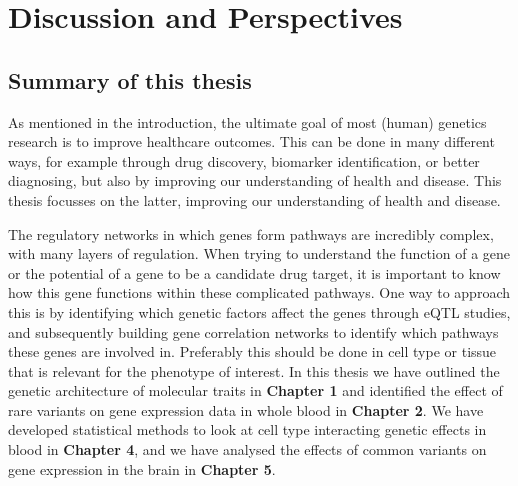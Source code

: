 \chapter{Discussion and Perspectives}
\label{chap:discussion}

{ \Large {} }

\newpage

\section{Summary of this thesis}
As mentioned in the introduction, the ultimate goal of most (human) genetics research is to improve healthcare outcomes. This can be done in many different ways, for example through drug discovery, biomarker identification, or better diagnosing, but also by improving our understanding of health and disease\cite{mcguireRoadAheadGenetics2020, claussnitzerBriefHistoryHuman2020e}. This thesis focusses on the latter, improving our understanding of health and disease. 

The regulatory networks in which genes form pathways are incredibly complex, with many layers of regulation. When trying to understand the function of a gene or the potential of a gene to be a candidate drug target, it is important to know how this gene functions within these complicated pathways. One way to approach this is by identifying which genetic factors affect the genes through eQTL studies, and subsequently building gene correlation networks to identify which pathways these genes are involved in. Preferably this should be done in cell type or tissue that is relevant for the phenotype of interest. In this thesis we have outlined the genetic architecture of molecular traits in \textbf{Chapter 1}\cite{claringbouldGeneticArchitectureMolecular2017} and identified the effect of rare variants on gene expression data in whole blood in \textbf{Chapter 2}\cite{kleinImbalancedExpressionPredicted2020}. We have developed statistical methods to look at cell type interacting genetic effects in blood in \textbf{Chapter 4}\cite{raulaguirre-gamboaDeconvolutionBulkBlood2020}, and we have analysed the effects of common variants on gene expression in the brain in \textbf{Chapter 5}. 

